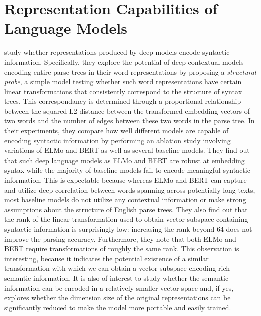 \documentclass[11pt,a4paper]{article}
\begin{document}
\section{Representation Capabilities of Language Models}
\cite{hewitt-manning-2019-structural} study whether representations produced by deep models encode syntactic information. 
Specifically, they explore the potential of deep contextual models encoding entire parse trees in their word representations by proposing a \textit{structural probe}, a simple model testing whether such word representations have certain linear transformations that consistently correspond to the structure of syntax trees. 
This correspondancy is determined through a proportional relationship between the squared L2 distance between the transformed embedding vectors of two words and the number of edges between these two words in the parse tree. 
In their experiments, they compare how well different models are capable of encoding syntactic information by performing an ablation study involving variations of ELMo and BERT as well as several baseline models. 
They find out that such deep language models as ELMo and BERT are robust at embedding syntax while the majority of baseline models fail to encode meaningful syntactic information. 
This is expectable because whereas ELMo and BERT can capture and utilize deep correlation between words spanning across potentially long texts, most baseline models do not utilize any contextual information or make strong assumptions about the structure of English parse trees. 
They also find out that the rank of the linear transformation used to obtain vector subspace containing syntactic information is surprisingly low: increasing the rank beyond 64 does not improve the parsing accuracy.
Furthermore, they note that both ELMo and BERT require transformations of roughly the same rank. 
This observation is interesting, because it indicates the potential existence of a similar transformation with which we can obtain a vector subspace encoding rich semantic information.
It is also of interest to study whether the semantic information can be encoded in a relatively smaller vector space and, if yes, explores whether the dimension size of the original representations can be significantly reduced to make the model more portable and easily trained. 
\end{document}
